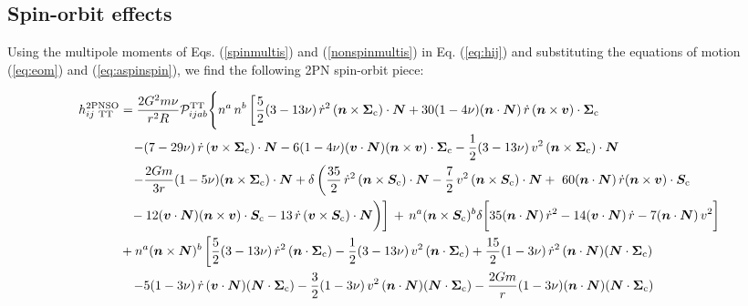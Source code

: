 \documentclass[aps, prd,
twocolumn,%
superscriptaddress,
showpacs, nofootinbib, eqsecnum, amsmath, amssymb, floatfix
]{revtex4}
\begin{document}
\subsection{Spin-orbit effects}
\label{sec:SO}
Using the multipole moments of Eqs. (\ref{spinmultis}) and
(\ref{nonspinmultis}) in Eq. (\ref{eq:hij}) and substituting the equations of
motion (\ref{eq:eom}) and (\ref{eq:aspinspin}), we find the following 2PN
spin-orbit piece:
\begin{widetext}
\begin{align}
\label{eq:hijSO}
h_{ij \ {\rm{TT}}}^{\rm 2PN SO}&=
\frac{2 G^2 m\nu}{r^2R}{\cal P}^{\rm TT}_{ijab}\Bigg\{
n^a \, n^b \left[\frac{5}{2} (3-13\nu) \, \dot r^2 \, (\bm{n}\times
\bm{\Sigma}_{\rm c})\cdot \bm{N} +30 (1-4\nu)(\bm{n}\cdot \bm{N}) \,
\dot r \, (\bm{n}\times\bm{v})\cdot \bm{\Sigma}_{\rm c}
\right.\nonumber\\
& \left. \; \; \; -
(7-29\nu) \, \dot r \, (\bm{v}\times \bm{\Sigma}_{\rm c})\cdot \bm{N}
 -6(1-4\nu) (\bm{v}\cdot
\bm{N})(\bm{n}\times\bm{v})\cdot \bm{\Sigma}_{\rm c} -
\frac{1}{2}(3-13\nu) \, v^2
\, (\bm{n}\times \bm{\Sigma}_{\rm c})\cdot \bm{N}
\right.\nonumber\\
& \left. \; \; \; - \frac{2G m}{3r}(1-5\nu)
(\bm{n}\times \bm{\Sigma}_{\rm c})\cdot \bm{N} +\delta \left(
\frac{35}{2}\,  \dot r^2 \, (\bm{n}\times \bm{S}_{\rm c})\cdot \bm{N}-
\frac{7}{2} \, v^2 \,  (\bm{n}\times \bm{S}_{\rm c})\cdot \bm{N} +
\ 60 (\bm{n}\cdot \bm{N}) \, \dot r (\bm{n}\times\bm{v})\cdot \bm{S}_{\rm c}
\right.\right. \nonumber\\
&  \; \; \;  -
12(\bm{v}\cdot \bm{N})(\bm{n}\times\bm{v})\cdot \bm{S}_{\rm c} -13 \, \dot r \,
(\bm{v}\times \bm{S}_{\rm c})\cdot \bm{N} \bigg) \bigg]\, +
\, n^{a}(\bm{n}\times \bm{S}_{\rm c})^{b} \delta \bigg[
35 (\bm{n}\cdot \bm{N}) \, \dot r^2-
14 (\bm{v}\cdot \bm{N}) \, \dot r-
7 (\bm{n}\cdot \bm{N}) \, v^2 \bigg]\nonumber\\
& + n^{a}(\bm{n}\times \bm{N})^{b}\left[\frac{5}{2}(3-13\nu)
\, \dot r^2 \, (\bm{n}\cdot \bm{\Sigma}_{\rm c})-\frac{1}{2}(3-13\nu) \,
v^2  \, (\bm{n}\cdot \bm{\Sigma}_{\rm c})+
\frac{15}{2}(1-3\nu) \, \dot r^2
\, (\bm{n}\cdot \bm{N}) (\bm{N}\cdot \bm{\Sigma}_{\rm c}) \right.\nonumber\\
& \left. \; \; \;   -5 (1-3\nu)\, \dot r \,
(\bm{v}\cdot \bm{N}) (\bm{N}\cdot \bm{\Sigma}_{\rm c}) -
\frac{3}{2}(1-3\nu) \, v^2
\, (\bm{n}\cdot \bm{N})(\bm{N}\cdot \bm{\Sigma}_{\rm c})-\frac{2Gm}{r}(1-3\nu)
(\bm{n}\cdot \bm{N}) (\bm{N}\cdot \bm{\Sigma}_{\rm c})\right.\nonumber\\

\end{align}
\end{widetext}
\end{document}
